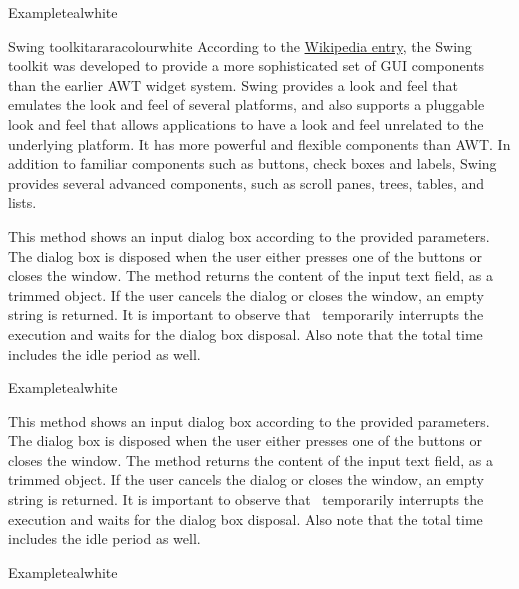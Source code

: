 \begin{description}
\begin{codebox}{Example}{teal}{\icnote}{white}
\end{codebox}

\begin{messagebox}{Swing toolkit}{araracolour}{\icok}{white}
According to the \href{https://en.wikipedia.org/wiki/Swing_(Java)}{Wikipedia entry}, the Swing toolkit was developed to provide a more sophisticated set of GUI components than the earlier  AWT widget system. Swing provides a look and feel that emulates the look and feel of several platforms, and also supports a pluggable look and feel that allows applications to have a look and feel unrelated to the underlying platform. It has more powerful and flexible components than AWT. In addition to familiar components such as buttons, check boxes and labels, Swing provides several advanced components, such as scroll panes, trees, tables, and lists.
\end{messagebox}

\item[\mddbox{C}{R}{showInput(int width, int icon, String title, String text)}{String}]

This method shows an input dialog box according to the provided parameters. The dialog box is disposed when the user either presses one of the buttons or closes the window. The method returns the content of the input text field, as a trimmed  object. If the user cancels the dialog or closes the window, an empty string is returned. It is important to observe that \arara\ temporarily interrupts the execution and waits for the dialog box disposal. Also note that the total time includes the idle period as well.

\begin{codebox}{Example}{teal}{\icnote}{white}
\end{codebox}

\item[\mddbox{C}{R}{showInput(int icon, String title, String text)}{String}]

This method shows an input dialog box according to the provided parameters. The dialog box is disposed when the user either presses one of the buttons or closes the window. The method returns the content of the input text field, as a trimmed  object. If the user cancels the dialog or closes the window, an empty string is returned. It is important to observe that \arara\ temporarily interrupts the execution and waits for the dialog box disposal. Also note that the total time includes the idle period as well.

\begin{codebox}{Example}{teal}{\icnote}{white}
\end{codebox}
\end{description}

